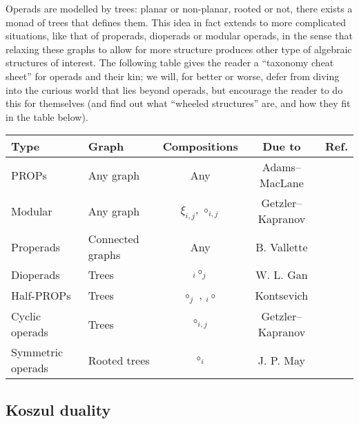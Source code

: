 Operads are modelled by trees: planar or
non-planar, rooted or not, there exists a monad
of trees that defines them. This idea
 in fact extends
to more complicated situations, like that of
properads, dioperads or modular operads,
in the sense that relaxing these
graphs to allow for more structure 
produces other type of algebraic structures
of interest. The following table
gives the reader a ``taxonomy cheat sheet''
for operads and their kin; we will, for better
or worse, defer from diving into the curious
world that lies beyond operads, but encourage
the reader to do this for themselves (and find
out what ``wheeled structures'' are, and how
they fit in the table below).

\begin{center}
\begin{tabular}{@{}llccr@{}} 

\toprule
Type 				& Graph 			& Compositions					& Due to 			& Ref.						\\
\midrule
PROPs 				& Any graph 		& Any  							& Adams--MacLane 	& \\
Modular 			& Any graph 		& $\xi_{i,j}$, $\circ_{i,j}$	& Getzler--Kapranov & \cite{Getzler1998}		\\ 
Properads 			& Connected graphs	& Any 							& B. Vallette 		& \cite{Vallette2004}		\\
Dioperads 			& Trees 			& ${}_i\circ_j$ 				& W. L. Gan 		& \cite{Gan2003}			\\
Half-PROPs 			& Trees 			& $\circ_j$ , ${}_i\circ$ 		& Kontsevich\footnotemark 	& \cite{Markl2007}	\\ 
Cyclic operads 		& Trees 			& $\circ_{i,j}$ 				& Getzler--Kapranov & \cite{Kajiura2008}		\\ 
Symmetric operads 	& Rooted trees 		& $\circ_i$  					& J. P. May			& \cite{May1972}			\\ 
\bottomrule
	\end{tabular}
		\end{center}

\subsection{Koszul duality}
 

